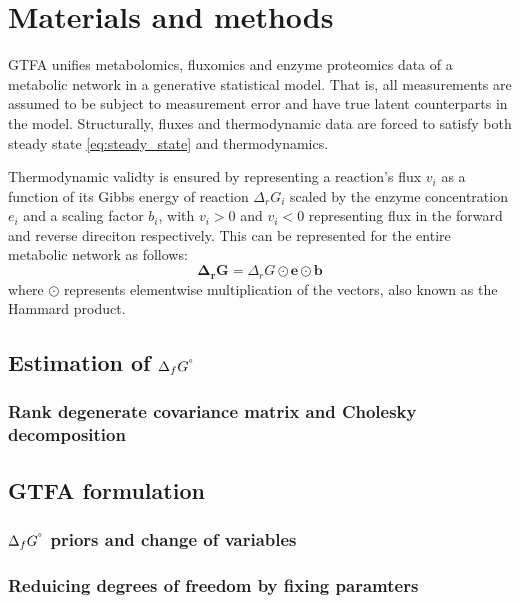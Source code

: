 \documentclass[10pt,letterpaper]{article}
\newcommand{\sdgf}{\Delta_fG^{\degree}}
\newcommand{\dgr}{\Delta_rG}
\newcommand{\bdgr}{\mathbf{\dgr}}
\begin{document}

\section*{Materials and methods}

GTFA unifies metabolomics, fluxomics and enzyme proteomics data of a metabolic network in a generative statistical model.
That is, all measurements are assumed to be subject to measurement error and have true latent counterparts in the model.
Structurally, fluxes and thermodynamic data are forced to satisfy both steady state \ref{eq:steady_state} and thermodynamics.

Thermodynamic validty is ensured by representing a reaction's flux $v_i$ as a function of its Gibbs energy of reaction $\dgr_i$ scaled by the enzyme concentration $e_i$ and a scaling factor $b_i$, with $v_i>0$ and $v_i<0$ representing flux in the forward and reverse direciton respectively.
This can be represented for the entire metabolic network as follows:
\[
    \bdgr = \dgr\odot\mathbf{e}\odot\mathbf{b}
\]
where $\odot$ represents elementwise multiplication of the vectors, also known as the Hammard product.

\subsection{Estimation of $\sdgf$}
\subsubsection{Rank degenerate covariance matrix and Cholesky decomposition}

\subsection{GTFA formulation}

\subsubsection{$\sdgf$ priors and change of variables}

\subsubsection{Reduicing degrees of freedom by fixing paramters}
\end{document}
